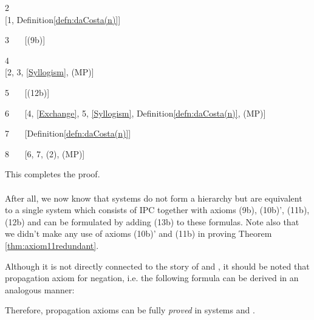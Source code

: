 \documentclass{llncs}
\begin{document}
2 \ \ \  \\ \hfill[1,
Definition\ref{defn:daCosta(n)}]

3 \ \ \  \hfill[(9b)]

4 \ \ \  \\ \hfill[2, 3, \eqref{Syllogism}, (MP)]

5 \ \ \  \hfill[(12b)]

6 \ \ \  \hfill[4, \eqref{Exchange},
5, \eqref{Syllogism}, Definition\ref{defn:daCosta(n)}, (MP)]

7 \ \ \  \hfill[Definition\ref{defn:daCosta(n)}]

8 \ \ \  \hfill[6, 7, (2), (MP)]

\noindent This completes the proof.
\\\\
After all, we now know that systems  do not form a hierarchy
but are equivalent to a single system which consists of IPC
together with axioms (9b), (10b)', (11b), (12b) and  can be
formulated by adding (13b) to these formulas. Note also that we
didn't make any use of axioms (10b)' and (11b) in proving Theorem
\ref{thm:axiom11redundant}.

Although it is not directly connected to the story of  and
, it should be noted that propagation axiom for negation,
i.e. the following formula can be derived in an analogous manner:

Therefore, propagation axioms can be fully {\it proved} in systems
 and .
\end{document}
